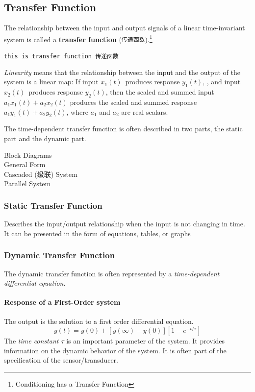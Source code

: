 \documentclass[a4paper,UTF8]{article}
\theoremstyle{mystyle}{
  \newtheorem{law}{Law}
}
\begin{document}
\subsection{Transfer Function}
The relationship between the input and output signals of a linear 
time-invariant system is called a \textbf{transfer function} ({\tt 传递函数}).\footnote{Conditioning
has a Transfer Function}

\verb|this is transfer function 传递函数|

\emph{Linearity} means that the relationship between the input and the output of the 
system is a linear map: If input $
{\displaystyle x_{1}(t)\,}$  produces response ${\displaystyle y_{1}(t),\,}$, 
and input ${\displaystyle x_{2}(t)\,}$ 
 produces response $y_{2}(t)$, then the scaled and summed input 
${\displaystyle a_{1}x_{1}(t)+a_{2}x_{2}(t)}$  produces the 
scaled and summed response ${\displaystyle a_{1}y_{1}(t)+a_{2}y_{2}(t)}$,  
where ${\displaystyle a_{1}}$  and ${\displaystyle a_{2}}$ are real scalars.

The time-dependent transfer function is often described in two parts, the static part and the dynamic part.

Block Diagrams\\
General Form\\
Cascaded (级联) System\\
Parallel System

\subsubsection{Static Transfer Function}
Describes the input/output relationship when the input is
not changing in time.
It can be presented in the form of equations, tables, or graphs
\subsubsection{Dynamic Transfer Function}
The dynamic transfer function is often represented by a \emph{time-dependent differential equation}.

\paragraph{Response of a First-Order system}
The output is the solution to a first order differential equation.
\[y(t)=y(0)+[y(\infty)-y(0)][1-e^{-t/\tau}]\]
The \emph{time constant $\tau$} is an important parameter of the system.
It provides information on the dynamic behavior of the system.
It is often part of the specification of the sensor/transducer.
\end{document}
